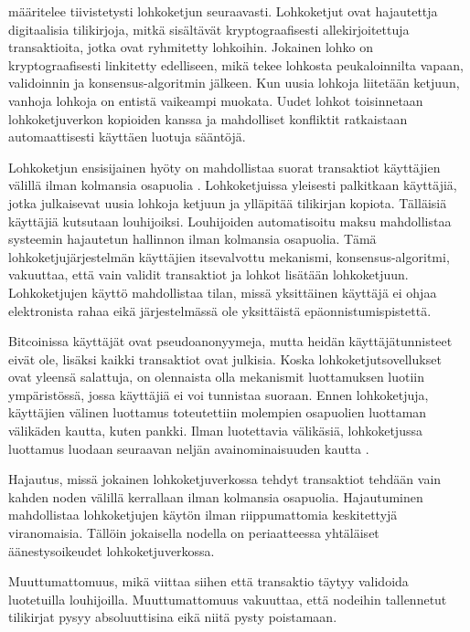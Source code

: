 \documentclass[utf8,bachelor]{gradu3}
\begin{document}
\cite{yaga2019blockchain} määritelee tiivistetysti lohkoketjun seuraavasti. Lohkoketjut ovat hajautettja digitaalisia tilikirjoja, mitkä sisältävät kryptograafisesti allekirjoitettuja transaktioita, jotka ovat ryhmitetty lohkoihin. Jokainen lohko on kryptograafisesti linkitetty edelliseen, mikä tekee lohkosta peukaloinnilta vapaan, validoinnin ja konsensus-algoritmin jälkeen. Kun uusia lohkoja liitetään ketjuun, vanhoja lohkoja on entistä vaikeampi muokata. Uudet lohkot toisinnetaan lohkoketjuverkon kopioiden kanssa ja mahdolliset konfliktit ratkaistaan automaattisesti käyttäen luotuja sääntöjä.

Lohkoketjun ensisijainen hyöty on mahdollistaa suorat transaktiot käyttäjien välillä ilman kolmansia osapuolia \parencite{yaga2019blockchain}.
Lohkoketjuissa yleisesti palkitkaan käyttäjiä, jotka julkaisevat uusia lohkoja ketjuun ja ylläpitää tilikirjan kopiota. Tälläisiä käyttäjiä kutsutaan louhijoiksi.
Louhijoiden automatisoitu maksu mahdollistaa systeemin hajautetun hallinnon ilman kolmansia osapuolia.
Tämä lohkoketjujärjestelmän käyttäjien itsevalvottu mekanismi, konsensus-algoritmi, vakuuttaa, että vain validit transaktiot ja lohkot lisätään lohkoketjuun.
Lohkoketjujen käyttö mahdollistaa tilan, missä yksittäinen käyttäjä ei ohjaa elektronista rahaa eikä järjestelmässä ole yksittäistä epäonnistumispistettä.

Bitcoinissa käyttäjät ovat pseudoanonyymeja, mutta heidän käyttäjätunnisteet eivät ole, lisäksi kaikki transaktiot ovat julkisia. Koska lohkoketjutsovellukset ovat yleensä salattuja, on olennaista olla mekanismit luottamuksen luotiin ympäristössä, jossa käyttäjiä ei voi tunnistaa suoraan. 
\parencite{yaga2019blockchain}
Ennen lohkoketjuja, käyttäjien välinen luottamus toteutettiin molempien osapuolien luottaman välikäden kautta, kuten pankki.
Ilman luotettavia välikäsiä, lohkoketjussa luottamus luodaan seuraavan neljän avainominaisuuden kautta \parencite{zarrin2021blockchain}.


Hajautus, missä jokainen lohkoketjuverkossa tehdyt transaktiot tehdään vain kahden noden välillä kerrallaan ilman kolmansia osapuolia. Hajautuminen mahdollistaa lohkoketjujen käytön ilman riippumattomia keskitettyjä viranomaisia. Tällöin jokaisella nodella on periaatteessa yhtäläiset äänestysoikeudet lohkoketjuverkossa.

Muuttumattomuus, mikä viittaa siihen että transaktio täytyy validoida luotetuilla louhijoilla. Muuttumattomuus vakuuttaa, että nodeihin tallennetut tilikirjat pysyy absoluuttisina eikä niitä pysty poistamaan.
\end{document}
